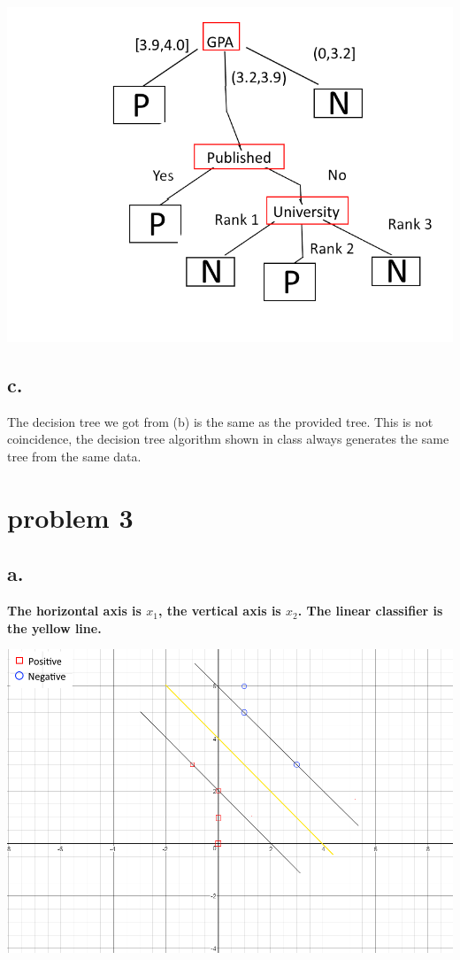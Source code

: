 \documentclass[12pt, letterpaper]{article}
\begin{document}
	\includegraphics[scale=0.6]{"problem-2-final"}
	
	\subsection{c.}
	
	The decision tree we got from (b) is the same as the provided tree.
	This is not coincidence, the decision tree algorithm shown in class always generates the same tree from the same data.
	
	\pagebreak
	\section{problem 3}
	
	\subsection{a.}
	\textbf{The horizontal axis is $x_{1}$, the vertical axis is $x_{2}$. The linear classifier is the yellow line.}
	
	\includegraphics[scale=0.6]{"problem-3-a-copy"}
	
\end{document}
